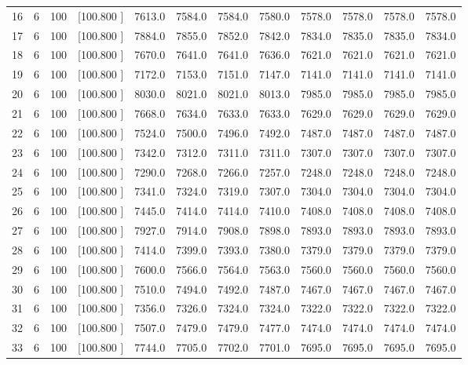 \documentclass[12pt,a4paper]{article}
\begin{document}
\begin{center}
{\begin{tabular}{r r r r r r r r r r r r}
  16&  6&100&[100.800   ]&  7613.0&  7584.0&  7584.0&  7580.0&  7578.0&  7578.0&  7578.0&  7578.0\\[-0.02in]
  17&  6&100&[100.800   ]&  7884.0&  7855.0&  7852.0&  7842.0&  7834.0&  7835.0&  7835.0&  7834.0\\[-0.02in]
  18&  6&100&[100.800   ]&  7670.0&  7641.0&  7641.0&  7636.0&  7621.0&  7621.0&  7621.0&  7621.0\\[-0.02in]
  19&  6&100&[100.800   ]&  7172.0&  7153.0&  7151.0&  7147.0&  7141.0&  7141.0&  7141.0&  7141.0\\[-0.02in]
  20&  6&100&[100.800   ]&  8030.0&  8021.0&  8021.0&  8013.0&  7985.0&  7985.0&  7985.0&  7985.0\\[-0.02in]
  21&  6&100&[100.800   ]&  7668.0&  7634.0&  7633.0&  7633.0&  7629.0&  7629.0&  7629.0&  7629.0\\[-0.02in]
  22&  6&100&[100.800   ]&  7524.0&  7500.0&  7496.0&  7492.0&  7487.0&  7487.0&  7487.0&  7487.0\\[-0.02in]
  23&  6&100&[100.800   ]&  7342.0&  7312.0&  7311.0&  7311.0&  7307.0&  7307.0&  7307.0&  7307.0\\[-0.02in]
  24&  6&100&[100.800   ]&  7290.0&  7268.0&  7266.0&  7257.0&  7248.0&  7248.0&  7248.0&  7248.0\\[-0.02in]
  25&  6&100&[100.800   ]&  7341.0&  7324.0&  7319.0&  7307.0&  7304.0&  7304.0&  7304.0&  7304.0\\[-0.02in]
  26&  6&100&[100.800   ]&  7445.0&  7414.0&  7414.0&  7410.0&  7408.0&  7408.0&  7408.0&  7408.0\\[-0.02in]
  27&  6&100&[100.800   ]&  7927.0&  7914.0&  7908.0&  7898.0&  7893.0&  7893.0&  7893.0&  7893.0\\[-0.02in]
  28&  6&100&[100.800   ]&  7414.0&  7399.0&  7393.0&  7380.0&  7379.0&  7379.0&  7379.0&  7379.0\\[-0.02in]
  29&  6&100&[100.800   ]&  7600.0&  7566.0&  7564.0&  7563.0&  7560.0&  7560.0&  7560.0&  7560.0\\[-0.02in]
  30&  6&100&[100.800   ]&  7510.0&  7494.0&  7492.0&  7487.0&  7467.0&  7467.0&  7467.0&  7467.0\\[-0.02in]
  31&  6&100&[100.800   ]&  7356.0&  7326.0&  7324.0&  7324.0&  7322.0&  7322.0&  7322.0&  7322.0\\[-0.02in]
  32&  6&100&[100.800   ]&  7507.0&  7479.0&  7479.0&  7477.0&  7474.0&  7474.0&  7474.0&  7474.0\\[-0.02in]
  33&  6&100&[100.800   ]&  7744.0&  7705.0&  7702.0&  7701.0&  7695.0&  7695.0&  7695.0&  7695.0\\[-0.02in]

\end{tabular}}
\end{center}
\end{document}
